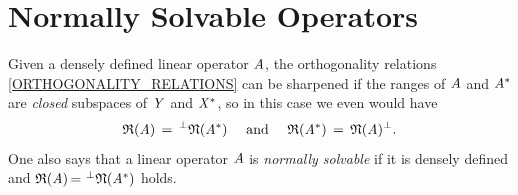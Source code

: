 \documentclass[11pt,twoside]{article}
\begin{document}

\section{Normally Solvable Operators}                                          %
Given a densely defined linear operator $\mathit{A}$,
the orthogonality relations \eqref{ORTHOGONALITY_RELATIONS} can be sharpened
if the ranges of $\mathit{A}$ and $\mathit{A}^*$ are \textit{closed} subspaces
of $\mathit{Y}$ and $\mathit{X}^*$,
so in this case we even would have
\[
{\mathfrak{R}(\mathit{A}) } \,=\, ^{\bot}\mathfrak{N}(\mathit{A}^*)
\quad \mbox{ and } \quad
{\mathfrak{R}(\mathit{A}^*) } \,=\, \mathfrak{N}(\mathit{A})^{\bot}.
\]
One also says that
a linear operator $\mathit{A}$ is \textit{normally solvable}
if it is densely defined and
$\mathfrak{R}(\mathit{A}) {\,=\,} \, ^{\bot}\mathfrak{N}(\mathit{A}^*)$ holds.
\end{document}
